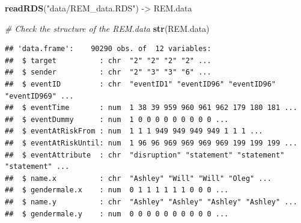 \documentclass[
]{article}
\newenvironment{Shaded}{\begin{snugshade}}{\end{snugshade}}
\newcommand{\AttributeTok}[1]{\textcolor[rgb]{0.13,0.29,0.53}{#1}}
\newcommand{\CommentTok}[1]{\textcolor[rgb]{0.56,0.35,0.01}{\textit{#1}}}
\newcommand{\ConstantTok}[1]{\textcolor[rgb]{0.56,0.35,0.01}{#1}}
\newcommand{\FunctionTok}[1]{\textcolor[rgb]{0.13,0.29,0.53}{\textbf{#1}}}
\newcommand{\NormalTok}[1]{#1}
\newcommand{\OtherTok}[1]{\textcolor[rgb]{0.56,0.35,0.01}{#1}}
\newcommand{\SpecialCharTok}[1]{\textcolor[rgb]{0.81,0.36,0.00}{\textbf{#1}}}
\newcommand{\StringTok}[1]{\textcolor[rgb]{0.31,0.60,0.02}{#1}}
\begin{document}
\begin{Shaded}
\end{Shaded}

\begin{Shaded}
\begin{Highlighting}[]
\FunctionTok{readRDS}\NormalTok{(}\StringTok{"data/REM\_data.RDS"}\NormalTok{) }\OtherTok{{-}\textgreater{}}\NormalTok{ REM.data}
\end{Highlighting}
\end{Shaded}

\begin{Shaded}
\begin{Highlighting}[]
\CommentTok{\# Check the structure of the REM.data}
\FunctionTok{str}\NormalTok{(REM.data)}
\end{Highlighting}
\end{Shaded}

\begin{verbatim}
## 'data.frame':    90290 obs. of  12 variables:
##  $ target          : chr  "2" "2" "2" "2" ...
##  $ sender          : chr  "2" "3" "3" "6" ...
##  $ eventID         : chr  "eventID1" "eventID96" "eventID96" "eventID969" ...
##  $ eventTime       : num  1 38 39 959 960 961 962 179 180 181 ...
##  $ eventDummy      : num  1 0 0 0 0 0 0 0 0 0 ...
##  $ eventAtRiskFrom : num  1 1 1 949 949 949 949 1 1 1 ...
##  $ eventAtRiskUntil: num  1 96 96 969 969 969 969 199 199 199 ...
##  $ eventAttribute  : chr  "disruption" "statement" "statement" "statement" ...
##  $ name.x          : chr  "Ashley" "Will" "Will" "Oleg" ...
##  $ gendermale.x    : num  0 1 1 1 1 1 1 0 0 0 ...
##  $ name.y          : chr  "Ashley" "Ashley" "Ashley" "Ashley" ...
##  $ gendermale.y    : num  0 0 0 0 0 0 0 0 0 0 ...
\end{verbatim}
\end{document}
